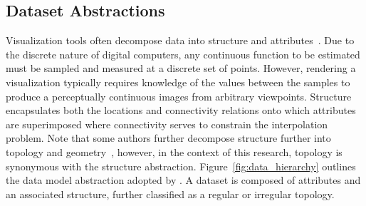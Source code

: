 \subsection{Dataset Abstractions}
Visualization tools often decompose data into structure and
attributes~\cite{vtk}. Due to the discrete nature of digital
computers, any continuous function to be estimated must be sampled and
measured at a discrete set of points. However, rendering a
visualization typically requires knowledge of the values between the
samples to produce a perceptually continuous images from arbitrary
viewpoints. Structure encapsulates both the locations and connectivity
relations onto which attributes are superimposed where connectivity
serves to constrain the interpolation problem. Note that some authors
further decompose structure further into topology and
geometry~\cite{weiler}, however, in the context of this research,
topology is synonymous with the structure
abstraction. Figure~\ref{fig:data_hierarchy} outlines the data model
abstraction adopted by \sciwms{}. A dataset is composed of attributes
and an associated structure, further classified as a regular or
irregular topology.

